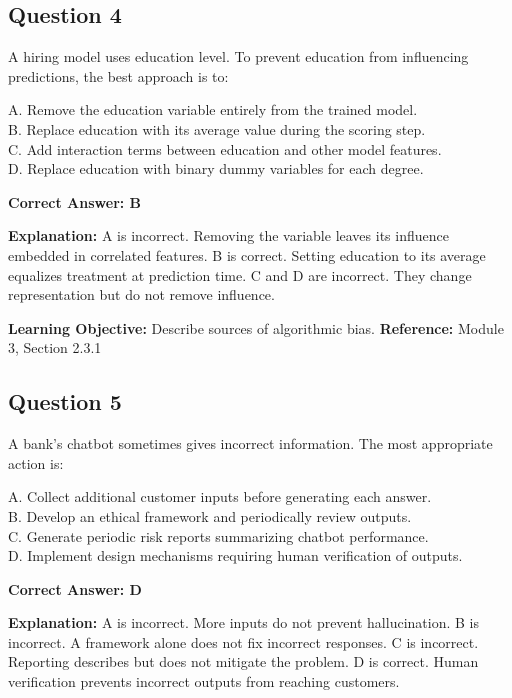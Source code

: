 \documentclass[11pt]{article}
\begin{document}
	\subsection*{Question 4}
	A hiring model uses education level. To prevent education from
	influencing predictions, the best approach is to:
	
	A. Remove the education variable entirely from the trained model.\\
	B. Replace education with its average value during the scoring step.\\
	C. Add interaction terms between education and other model features.\\
	D. Replace education with binary dummy variables for each degree.
	
	\vspace{0.4em}
	\textbf{Correct Answer: B}
	
	\textbf{Explanation:}
	A is incorrect. Removing the variable leaves its influence embedded in
	correlated features.
	B is correct. Setting education to its average equalizes treatment at
	prediction time.
	C and D are incorrect. They change representation but do not remove
	influence.
	
	\textbf{Learning Objective:} Describe sources of algorithmic bias.
	\textbf{Reference:} Module 3, Section 2.3.1
	
	\subsection*{Question 5}
	A bank's chatbot sometimes gives incorrect information. The most
	appropriate action is:
	
	A. Collect additional customer inputs before generating each answer.\\
	B. Develop an ethical framework and periodically review outputs.\\
	C. Generate periodic risk reports summarizing chatbot performance.\\
	D. Implement design mechanisms requiring human verification of outputs.
	
	\vspace{0.4em}
	\textbf{Correct Answer: D}
	
	\textbf{Explanation:}
	A is incorrect. More inputs do not prevent hallucination.
	B is incorrect. A framework alone does not fix incorrect responses.
	C is incorrect. Reporting describes but does not mitigate the problem.
	D is correct. Human verification prevents incorrect outputs from reaching
	customers.
	
\end{document}
